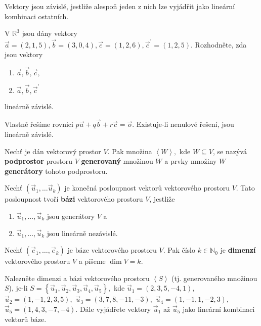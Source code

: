 \begin{veta}
    Vektory jsou závislé, jestliže alespoň jeden z nich lze vyjádřit jako lineární
    kombinaci ostatních.
\end{veta}

\begin{priklad}
V $\mathbb R^3$ jsou dány vektory $\vec a = (2,1,5), \vec b = (3,0,4), \vec c=(1,2,6),
\vec c^\prime = (1,2,5).$ Rozhodněte, zda jsou vektory
\begin{enumerate}[$a.$]
\item $\vec a, \vec b,\vec c,$
\item $\vec a, \vec b,\vec c^\prime$
\end{enumerate}
lineárně závislé.
\end{priklad}

\begin{reseni}
Vlastně řešíme rovnici $p\vec a + q\vec b + r\vec c= \vec o.$ Existuje-li nenulové
řešení, jsou lineárně závislé.
\end{reseni}

\begin{definition}
    Nechť je dán vektorový prostor $V$. Pak množina $\left < W \right >,$ kde $
    W\subseteq V$, se nazývá \textbf{podprostor} prostoru $V$ \textbf{generovaný}
    množinou $W$ a prvky množiny $W$ \textbf{generátory} tohoto podprostoru.
\end{definition}

\begin{definition}
    Nechť $(\vec u_1, \dots \vec u_k)$ je konečná posloupnost vektorů vektorového
    prostoru $V$. Tato posloupnost tvoří \textbf{bázi} vektorového prostoru $V$, jestliže
    \begin{enumerate}[$i.$]
    \item $\vec u_1, \dots, \vec u_k$ jsou generátory $V$ a
   	\item $\vec u_1, \dots, \vec u_k$ jsou lineárně nezávislé.
    \end{enumerate}
\end{definition}

\begin{definition}
Nechť $(\vec e_1,\dots, \vec e_k)$ je báze vektorového prostoru $V$. Pak číslo $k \in
\mathbb N_0$ je \textbf{dimenzí} vektorového prostoru $V$ a píšeme $\dim V=k$.
\end{definition}

\begin{priklad}
Nalezněte dimenzi a bázi vektorového prostoru $\left < S \right >$ (tj. generovaného množinou $S$), je-li $S = \left
\{ \vec u_1,\vec u_2,\vec u_3,\vec u_4,\vec u_5 \right \}, $
kde
$\vec u_1=(2,3,5,-4,1),$ $\vec u_2=(1,-1,2,3,5),$ $\vec u_3=(3,7,8,-11,-3),$ $\vec u_4=(1,-1,1,-2,3),$ $\vec u_5=(1,4,3,-7,-4).$
Dále vyjádřete vektory $\vec u_1$ až $\vec u_5$ jako lineární kombinaci vektorů báze.
\end{priklad}

